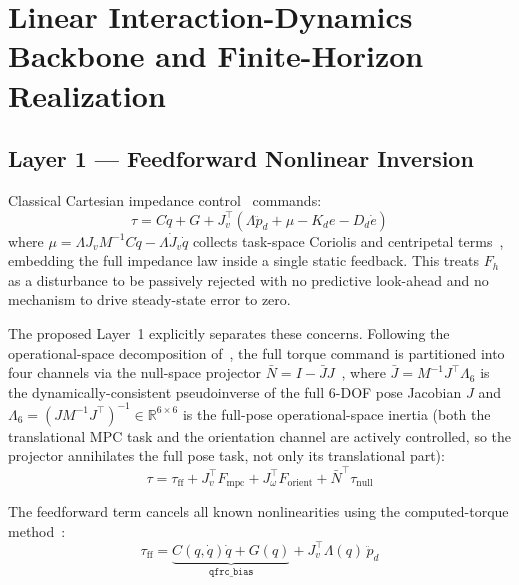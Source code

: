 \documentclass[journal]{IEEEtran}
\newcommand{\Fmpc}{F_{\text{mpc}}}
\newcommand{\Nbar}{\bar{N}}
\begin{document}
\section{Linear Interaction-Dynamics Backbone and Finite-Horizon Realization}

\subsection{Layer 1 --- Feedforward Nonlinear Inversion}
\label{sec:layer1}

Classical Cartesian impedance control~\cite{hogan1985impedance} commands:
\begin{equation*}
  \tau = C\dot{q}+G+J_v^\top(\Lambda\ddot{p}_d+\mu-K_de-D_d\dot{e})
\end{equation*}
where $\mu=\Lambda J_vM^{-1}C\dot{q}-\Lambda\dot{J}_v\dot{q}$ collects
task-space Coriolis and centripetal terms~\cite{khatib1987unified},
embedding the full impedance law inside a single static feedback.
This treats $F_h$ as a disturbance to be passively rejected with no
predictive look-ahead and no mechanism to drive steady-state error to
zero.

The proposed Layer~1 explicitly separates these concerns.
Following the operational-space decomposition of~\cite{khatib1987unified},
the full torque command is partitioned into four channels via the
null-space projector $\Nbar=I-\bar{J}J$~\cite{sentis2005synthesis}, where
$\bar{J}=M^{-1}J^\top\Lambda_6$ is the dynamically-consistent pseudoinverse
of the full $6$-DOF pose Jacobian $J$ and
$\Lambda_6=(JM^{-1}J^\top)^{-1}\in\mathbb{R}^{6\times6}$ is the full-pose
operational-space inertia (both the translational MPC task and the
orientation channel are actively controlled, so the projector annihilates
the full pose task, not only its translational part):
\begin{equation}\label{eq:tau}
  \tau = \tau_{\text{ff}}+J_v^\top\Fmpc
        +J_\omega^\top F_{\text{orient}}+\Nbar^\top\tau_{\text{null}}
\end{equation}

The feedforward term cancels all known nonlinearities using the
computed-torque method~\cite{siciliano2009robotics}:
\begin{equation}\label{eq:tff}
  \tau_{\text{ff}} = \underbrace{C(q,\dot{q})\dot{q}+G(q)}_{\texttt{qfrc\_bias}}
                   + J_v^\top\Lambda(q)\,\ddot{p}_d
\end{equation}
\end{document}
